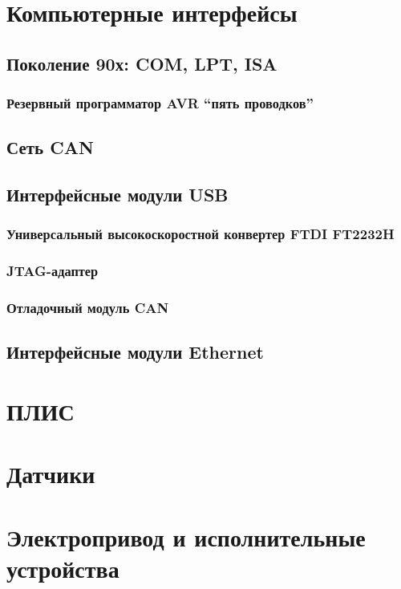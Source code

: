 \chapter{Компьютерные интерфейсы}

\section{Поколение 90х: COM, LPT, ISA}

\subsection{Резервный программатор AVR ``пять проводков''}

\section{Сеть CAN}

\section{Интерфейсные модули USB}

\subsection{Универсальный высокоскоростной конвертер FTDI FT2232H}

\subsection{JTAG-адаптер}

\subsection{Отладочный модуль CAN}

\section{Интерфейсные модули Ethernet}

\chapter{ПЛИС}

\chapter{Датчики}

\chapter{Электропривод и исполнительные устройства}

